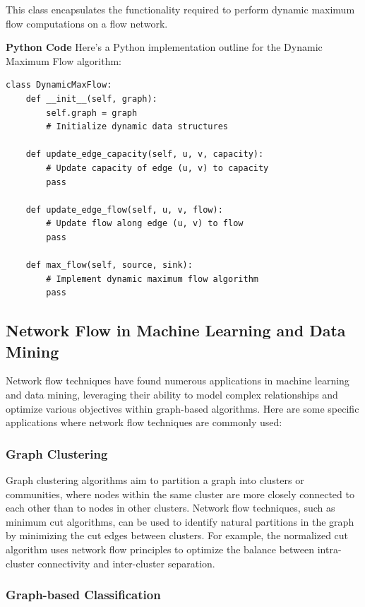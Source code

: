 \documentclass[12pt]{book} %
\begin{document}
This class encapsulates the functionality required to perform dynamic maximum flow computations on a flow network.


\textbf{Python Code}
Here's a Python implementation outline for the Dynamic Maximum Flow algorithm:
\FloatBarrier
\begin{lstlisting}
class DynamicMaxFlow:
    def __init__(self, graph):
        self.graph = graph
        # Initialize dynamic data structures

    def update_edge_capacity(self, u, v, capacity):
        # Update capacity of edge (u, v) to capacity
        pass

    def update_edge_flow(self, u, v, flow):
        # Update flow along edge (u, v) to flow
        pass

    def max_flow(self, source, sink):
        # Implement dynamic maximum flow algorithm
        pass
\end{lstlisting}
\FloatBarrier

\subsection{Network Flow in Machine Learning and Data Mining}

Network flow techniques have found numerous applications in machine learning and data mining, leveraging their ability to model complex relationships and optimize various objectives within graph-based algorithms. Here are some specific applications where network flow techniques are commonly used:

\subsubsection{Graph Clustering}

Graph clustering algorithms aim to partition a graph into clusters or communities, where nodes within the same cluster are more closely connected to each other than to nodes in other clusters. Network flow techniques, such as minimum cut algorithms, can be used to identify natural partitions in the graph by minimizing the cut edges between clusters. For example, the normalized cut algorithm uses network flow principles to optimize the balance between intra-cluster connectivity and inter-cluster separation.

\subsubsection{Graph-based Classification}
\end{document}
